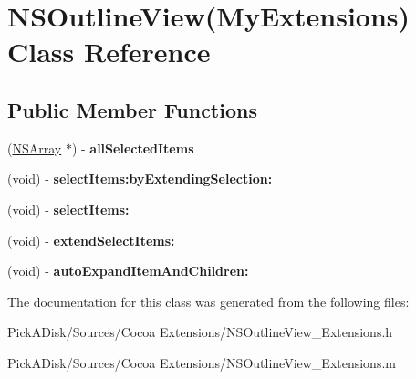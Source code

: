\hypertarget{interface_n_s_outline_view_07_my_extensions_08}{
\section{NSOutlineView(MyExtensions) Class Reference}
\label{interface_n_s_outline_view_07_my_extensions_08}
}
\subsection*{Public Member Functions}
\begin{DoxyCompactItemize}
\item 
\hypertarget{interface_n_s_outline_view_07_my_extensions_08_a4c79718a0887ff8a763d7f1da92bcde6}{
(\hyperlink{class_n_s_array}{NSArray} $\ast$) -\/ {\bfseries allSelectedItems}}
\label{interface_n_s_outline_view_07_my_extensions_08_a4c79718a0887ff8a763d7f1da92bcde6}

\item 
\hypertarget{interface_n_s_outline_view_07_my_extensions_08_ac4606b57293dbb470d224bc994761432}{
(void) -\/ {\bfseries selectItems:byExtendingSelection:}}
\label{interface_n_s_outline_view_07_my_extensions_08_ac4606b57293dbb470d224bc994761432}

\item 
\hypertarget{interface_n_s_outline_view_07_my_extensions_08_a92af70ca6ec355e86e03eb3d87959261}{
(void) -\/ {\bfseries selectItems:}}
\label{interface_n_s_outline_view_07_my_extensions_08_a92af70ca6ec355e86e03eb3d87959261}

\item 
\hypertarget{interface_n_s_outline_view_07_my_extensions_08_a5129c6c4a844b6441ae2303ac738c7a3}{
(void) -\/ {\bfseries extendSelectItems:}}
\label{interface_n_s_outline_view_07_my_extensions_08_a5129c6c4a844b6441ae2303ac738c7a3}

\item 
\hypertarget{interface_n_s_outline_view_07_my_extensions_08_a970183107a7948033445a215797ef4fc}{
(void) -\/ {\bfseries autoExpandItemAndChildren:}}
\label{interface_n_s_outline_view_07_my_extensions_08_a970183107a7948033445a215797ef4fc}

\end{DoxyCompactItemize}


The documentation for this class was generated from the following files:\begin{DoxyCompactItemize}
\item 
PickADisk/Sources/Cocoa Extensions/NSOutlineView\_\-Extensions.h\item 
PickADisk/Sources/Cocoa Extensions/NSOutlineView\_\-Extensions.m\end{DoxyCompactItemize}
